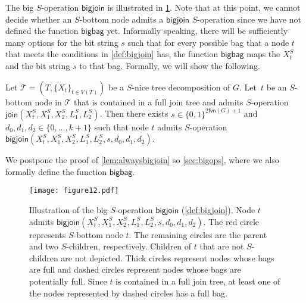 \documentclass[a4paper,UKenglish,cleveref, autoref, thm-restate, numberwithinsect]{lipics-v2021}
\newcommand{\fvn}{\mathsf{fvn}}
\newcommand{\join}{\mathsf{join}}
\newcommand{\bigjoin}{\mathsf{bigjoin}}
\newcommand{\bigbag}{\mathsf{bigbag}}
\newcommand{\slim}{\text{slim}\xspace}
\begin{document}
The big $S$-operation $\bigjoin$ is illustrated in \cref{fig:bigops}. Note that at this point, we cannot decide whether an $S$-bottom node admits a $\bigjoin$ $S$-operation since we have not defined the function $\bigbag$ yet. Informally speaking, there will be sufficiently many options for the bit string $s$ such that for every possible bag that a node $t$ that meets the conditions in \cref{def:bigjoin} has, the function $\bigbag$ maps the $X_t^S$ and the bit string $s$ to that bag. Formally, we will show the following.

\begin{lemma}\label{lem:alwaysbigjoin}
Let $\mathcal{T}=(T,\{X_t\}_{t\in V(T)})$ be a \slim $S$-nice tree decomposition of $G$. Let~$t$ be an $S$-bottom node in $\mathcal{T}$ that is contained in a full join tree and admits $S$-operation $\join(X_t^S,X_1^S,X_2^S,L_{1}^S, L_{2}^S)$. Then there exists $s\in\{0,1\}^{2\fvn(G)+1}$ and $d_0,d_1,d_2\in\{0,\ldots,k+1\}$ such that node $t$ admits $S$-operation $\bigjoin(X^S_t,X_1^S,X_2^S,L_{1}^S, L_{2}^S,s,d_0,d_1,d_2)$.
\end{lemma}
We postpone the proof of \cref{lem:alwaysbigjoin} so \cref{sec:bigops}, where we also formally define the function $\bigbag$.

\begin{figure}[t]
\centering
\texttt{[image: figure12.pdf]}
    \caption{Illustration of the big $S$-operation $\bigjoin$ (\cref{def:bigjoin}). Node $t$ admits $\bigjoin(X^S_t,X_1^S,X_2^S,L_{1}^S, L_{2}^S,s,d_0,d_1,d_2)$. The red circle represents $S$-bottom node $t$. The remaining circles are the parent and two $S$-children, respectively. Children of $t$ that are not $S$-children are not depicted. Thick circles represent nodes whose bags are full and dashed circles represent nodes whose bags are potentially full. Since $t$ is contained in a full join tree, at least one of the nodes represented by dashed circles has a full bag.}\label{fig:bigops}
\end{figure}
\end{document}
